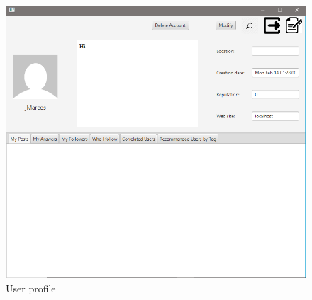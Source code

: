 \documentclass[11pt]{report}
\begin{document}
\begin{figure}[H]
  \centering
  \includegraphics[width=\textwidth,keepaspectratio=true]{img/user_manual/ProfiloUtente.png}
  \caption{User profile}
  \label{fig:ProfiloUtente}
\end{figure}
\end{document}
